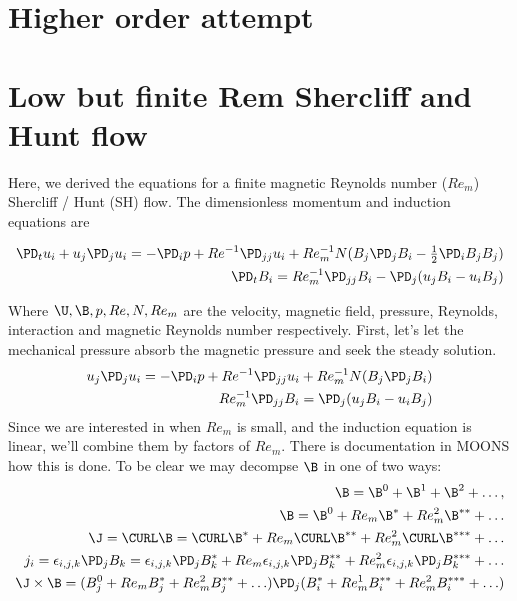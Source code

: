 \documentclass[11pt]{article}
\begin{document}
\doublespacing
\MOONSTITLE
\maketitle

\section{Higher order attempt}
\section{Low but finite Rem Shercliff and Hunt flow}
Here, we derived the equations for a finite magnetic Reynolds number ($Re_m$) Shercliff / Hunt (SH) flow. The dimensionless momentum and induction equations are

\begin{equation}\begin{aligned}
\PD_t u_i+u_j\PD_j u_i =-\PD_i p+ Re^{-1} \PD_{jj} u_i + Re_m^{-1} N (B_j \PD_j B_i - \tfrac{1}{2} \PD_i B_j B_j) \\
\PD_t B_i = Re_m^{-1} \PD_{jj} B_i - \PD_j (u_j B_i - u_i B_j)
\end{aligned} \end{equation}

Where $\U,\B,p,Re,N,Re_m$ are the velocity, magnetic field, pressure, Reynolds, interaction and magnetic Reynolds number respectively. First, let's let the mechanical pressure absorb the magnetic pressure and seek the steady solution.
\begin{equation}\begin{aligned}
u_j\PD_j u_i =-\PD_i p+ Re^{-1} \PD_{jj} u_i + Re_m^{-1} N (B_j \PD_j B_i) \\
Re_m^{-1} \PD_{jj} B_i = \PD_j (u_j B_i - u_i B_j)
\end{aligned} \end{equation}
Since we are interested in when $Re_m$ is small, and the induction equation is linear, we'll combine them by factors of $Re_m$. There is documentation in MOONS how this is done. To be clear we may decompse $\B$ in one of two ways:
\begin{equation}\begin{aligned}
	\B = \B^0 + \B^1 + \B^2 + \hdots , \\
	\B = \B^0 + Re_m \B^* + Re_m^2 \B^{**} + \hdots \\
	\J = \CURL \B = \CURL \B^* + Re_m \CURL \B^{**} + Re_m^2 \CURL \B^{***} + \hdots \\
	 j_i = \epsilon_{i,j,k} \PD_j B_k = \epsilon_{i,j,k} \PD_j B_k^* + Re_m \epsilon_{i,j,k} \PD_j B_k^{**} + Re_m^2 \epsilon_{i,j,k} \PD_j B_k^{***} + \hdots \\
	\J \times \B = (B_j^0+Re_m B_j^*+Re_m^2 B_j^{**} + \hdots) \PD_j (B_i^*+Re_m^1 B_i^{**}+Re_m^2 B_i^{***} + \hdots) \\
\end{aligned} \end{equation}
\end{document}
